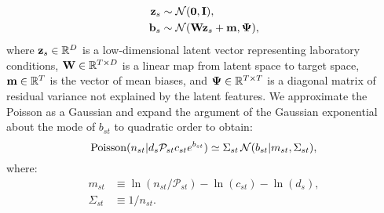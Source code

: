 \documentclass[nofootinbib,amssymb,amsmath]{revtex4}
\newcommand{\vzero}{{\bf 0}}
\newcommand{\vI}{{\bf I}}
\newcommand{\vb}{{\bf b}}
\newcommand{\vz}{{\bf z}}
\newcommand{\vm}{{\bf m}}
\newcommand{\vW}{{\bf W}}
\newcommand{\vPsi}{{\bf \Psi}}
\newcommand{\PP}{\mathcal{P}}
\newcommand{\norm}{{\mathcal N}}
\begin{document}
%
\begin{align}
\vz_s &\sim \norm(\vzero, \vI), \nonumber\\
\vb_s &\sim \norm(\vW \vz_s + \vm, \vPsi),
\end{align}
%
where $\vz_s \in \mathbb{R}^D$ is a low-dimensional latent vector representing laboratory conditions, $\vW \in \mathbb{R}^{T \times D}$ is a linear map from latent space to target space, $\vm \in \mathbb{R}^T$ is the vector of mean biases, and $\vPsi \in \mathbb{R}^{T \times T}$ is a diagonal matrix of residual variance not explained by the latent features. We approximate the Poisson as a Gaussian and expand the argument of the Gaussian exponential about the mode of $b_{st}$ to quadratic order to obtain:
%
\begin{equation}\label{eq:gaussian_approx_coverage}
{\rm Poisson}(n_{st} | d_s \PP_{st} c_{st} e^{b_{st}}) \simeq \Sigma_{st} \, \norm(b_{st} | m_{st}, \Sigma_{st}),
\end{equation}
where:
\begin{align}
m_{st} &\equiv \ln(n_{st}/\PP_{st}) - \ln (c_{st}) - \ln(d_s), \nonumber\\
\Sigma_{st} &\equiv 1/n_{st}.
\label{eq:m_sigma_def}
\end{align}

\end{document}
